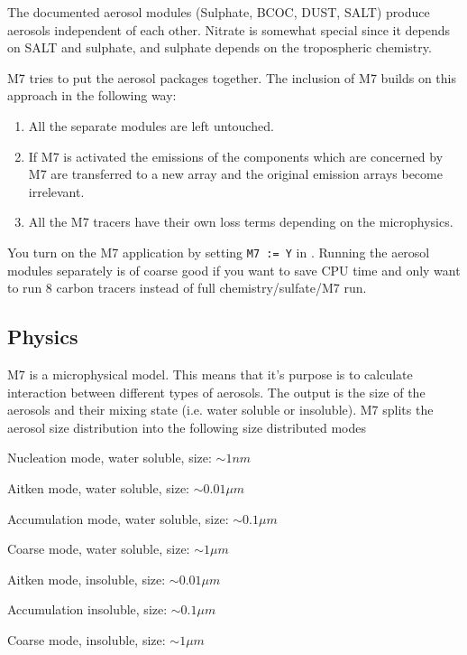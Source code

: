 The documented aerosol modules (Sulphate, BCOC, DUST, SALT) produce
aerosols independent of each other. Nitrate is somewhat special since
it depends on SALT and sulphate, and sulphate depends on the
tropospheric chemistry.

M7 tries to put the aerosol packages together. The inclusion of M7
builds on this approach in the following way:
\begin{enumerate}
  \item All the separate modules are left untouched.
  \item If M7 is activated the emissions of the components which 
    are concerned by M7 are transferred to a new array and the 
    original emission arrays become irrelevant.
  \item All the M7 tracers have their own loss terms depending
    on the microphysics.
\end{enumerate}

You turn on the M7 application by setting \verb#M7 := Y# in
\makefile. Running the aerosol modules separately is of coarse good if
you want to save CPU time and only want to run 8 carbon tracers
instead of full chemistry/sulfate/M7 run.


\subsection{Physics}
M7 is a microphysical model. This means that it's purpose is to
calculate interaction between different types of aerosols. The output
is the size of the aerosols and their mixing state (i.e. water soluble
or insoluble). M7 splits the aerosol size distribution into the
following size distributed modes
\begin{itemize2}
  \item Nucleation mode, water soluble, size: $\sim 1 nm$
  \item Aitken mode, water soluble,  size: $\sim 0.01 {\mu}m$
  \item Accumulation mode, water soluble, size: $\sim 0.1 {\mu}m$
  \item Coarse mode, water soluble, size: $\sim 1 {\mu}m$
  \item Aitken mode, insoluble,  size: $\sim 0.01 {\mu}m$
  \item Accumulation insoluble, size: $\sim 0.1 {\mu}m$
  \item Coarse mode, insoluble, size: $\sim 1 {\mu}m$
\end{itemize2}

